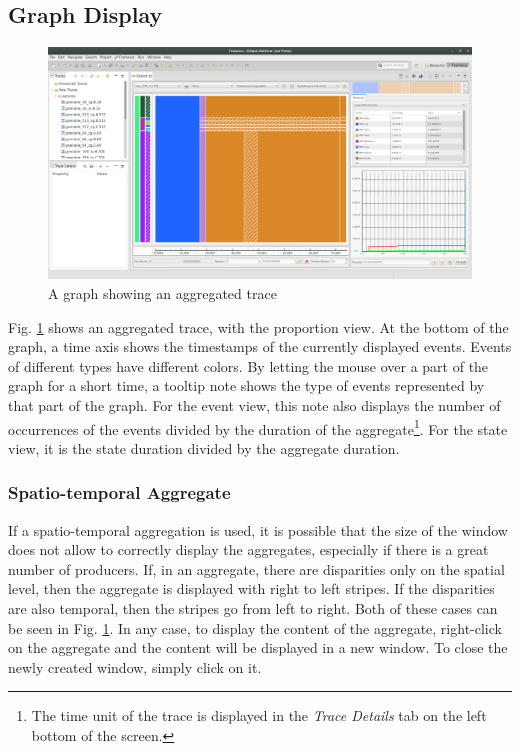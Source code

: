 \documentclass[twoside]{article}
\begin{document}
\begin{sloppypar}
\subsection{Graph Display}
\begin{figure}[h!]
	\centering
	\includegraphics[width=1.0\textwidth]{images/ocelotlAggregated.png}
	\caption{A graph showing an aggregated trace}
	\label{showAggreg}
\end{figure}

Fig. \ref{showAggreg} shows an aggregated trace, with the proportion view. At the bottom of the graph, a time axis shows the timestamps of the currently displayed events. Events of different types have different colors. By letting the mouse over a part of the graph for a short time, a tooltip note shows the type of events represented by that part of the graph. For the event view, this note also displays the number of occurrences of the events divided by the duration of the aggregate\footnote{The time unit of the trace is displayed in the \textit{Trace Details} tab on the left bottom of the screen.}. For the state view, it is the state duration divided by the aggregate duration.

\subsubsection{Spatio-temporal Aggregate}
If a spatio-temporal aggregation is used, it is possible that the size of the window does not allow to correctly display the aggregates, especially if there is a great number of producers. If, in an aggregate, there are disparities only on the spatial level, then the aggregate is displayed with right to left stripes. If the disparities are also temporal, then the stripes go from left to right. Both of these cases can be seen in Fig. \ref{showAggreg}. In any case, to display the content of the aggregate, right-click on the aggregate and the content will be displayed in a new window. To close the newly created window, simply click on it.


\end{sloppypar}
\end{document}
